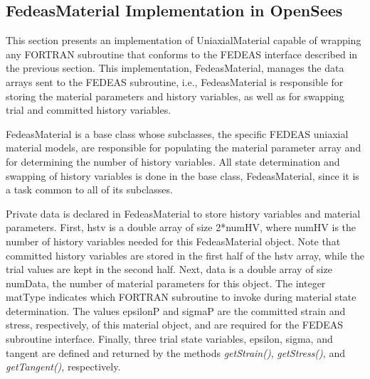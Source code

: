 \documentclass[12pt]{article}
\begin{document}
\subsection{FedeasMaterial Implementation in OpenSees}
This section presents an implementation of UniaxialMaterial capable of wrapping any
FORTRAN subroutine that conforms to the FEDEAS interface described in the previous
section. This implementation, FedeasMaterial, manages the data arrays sent to the
FEDEAS subroutine, i.e., FedeasMaterial is responsible for storing the material
parameters and history variables, as well as for swapping trial and committed history
variables.

FedeasMaterial is a base class whose subclasses, the specific FEDEAS uniaxial material models, 
are responsible for populating the material parameter array and for determining the number 
of history variables. All state determination and swapping of history variables is done
in the base class, FedeasMaterial, since it is a task common to all of its subclasses.

Private data is declared in FedeasMaterial to store history variables and material parameters.
First, hstv is a double array of size 2*numHV, where numHV is the number of history variables
needed for this FedeasMaterial object. Note that committed history variables are stored in the
first half of the hstv array, while the trial values are kept in the second half.
Next, data is a double array of size numData, the number
of material parameters for this object. The integer matType indicates which FORTRAN subroutine
to invoke during material state determination. The values epsilonP and sigmaP are the committed
strain and stress, respectively, of this material object, and are required for the FEDEAS subroutine
interface. Finally, three trial state variables, epsilon, sigma, and tangent are defined and 
returned by the methods {\em getStrain()}, {\em getStress()}, and {\em getTangent()}, respectively.
\end{document}
